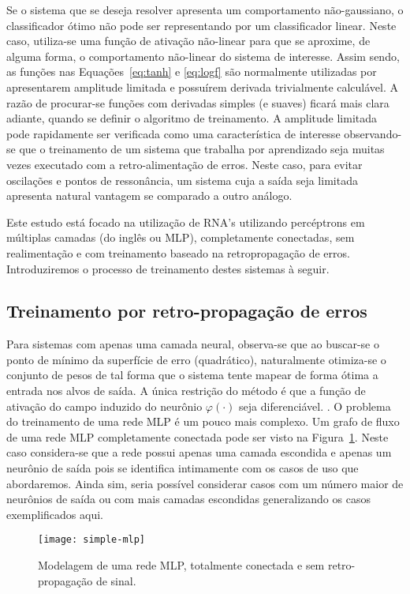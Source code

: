 Se o sistema que se deseja resolver apresenta um comportamento não-gaussiano,
o classificador ótimo não pode ser representando por um classificador
linear. Neste caso, utiliza-se uma função de ativação não-linear para que se
aproxime, de alguma forma, o comportamento não-linear do sistema de interesse.
Assim sendo, as funções nas Equações~\ref{eq:tanh} e \ref{eq:logf} são
normalmente utilizadas por apresentarem amplitude limitada e possuírem
derivada trivialmente calculável. A razão de procurar-se funções com derivadas
simples (e suaves) ficará mais clara adiante, quando se definir o algoritmo de
treinamento. A amplitude limitada pode rapidamente ser verificada como uma
característica de interesse observando-se que o treinamento de um sistema que
trabalha por aprendizado seja muitas vezes executado com a retro-alimentação
de erros. Neste caso, para evitar oscilações e pontos de ressonância, um
sistema cuja a saída seja limitada apresenta natural vantagem se comparado a
outro análogo.

Este estudo está focado na utilização de RNA's utilizando percéptrons em
múltiplas camadas (do inglês  ou MLP),
completamente conectadas, sem realimentação e com treinamento baseado na
retropropagação de erros. Introduziremos o processo de treinamento destes
sistemas à seguir.

\subsection{Treinamento por retro-propagação de erros}

Para sistemas com apenas uma camada neural, observa-se que ao buscar-se o
ponto de mínimo da superfície de erro (quadrático), naturalmente otimiza-se o
conjunto de pesos de tal forma que o sistema tente mapear de forma ótima a
entrada nos alvos de saída. A única restrição do método é que a função de
ativação do campo induzido do neurônio $\varphi(\cdot)$ seja diferenciável.
\cite{rosenblatt}. O problema do treinamento de uma rede MLP é um pouco mais
complexo. Um grafo de fluxo de uma rede MLP completamente conectada pode ser
visto na Figura~\ref{fig:simple-mlp}. Neste caso considera-se que a rede
possui apenas uma camada escondida e apenas um neurônio de saída pois se
identifica intimamente com os casos de uso que abordaremos. Ainda sim, seria
possível considerar casos com um número maior de neurônios de saída ou com
mais camadas escondidas generalizando os casos exemplificados aqui.

\begin{figure}
\begin{center}
\texttt{[image: simple-mlp]}
\end{center}
\caption{Modelagem de uma rede MLP, totalmente conectada e sem
retro-propagação de sinal.}
\label{fig:simple-mlp}
\end{figure}

